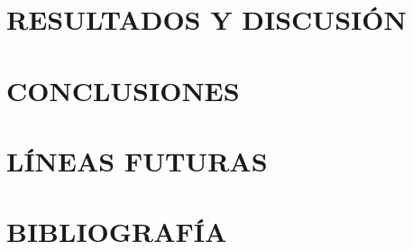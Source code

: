 \documentclass[a4paper, 12pt, spanish, twoside]{article}
\begin{document}




\newpage
\section{RESULTADOS Y DISCUSIÓN} \label{sec:resultados_y_discusion}

\clearpage





\newpage
\section{CONCLUSIONES} \label{sec:conclusiones}

\clearpage





\newpage
\section{LÍNEAS FUTURAS} \label{sec:lineas_futuras}

\clearpage





\newpage
\section*{BIBLIOGRAFÍA}
\end{document}
